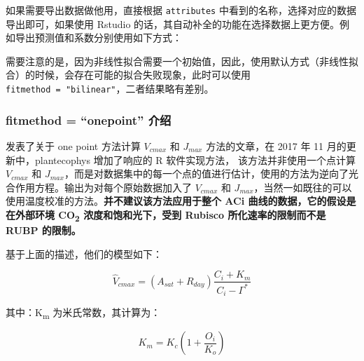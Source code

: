 \documentclass[]{krantz}
\makeatletter
\newenvironment{Shaded}{\begin{snugshade}}{\end{snugshade}}
\newcommand{\KeywordTok}[1]{\textcolor[rgb]{0.13,0.29,0.53}{\textbf{#1}}}
\newcommand{\DataTypeTok}[1]{\textcolor[rgb]{0.13,0.29,0.53}{#1}}
\newcommand{\StringTok}[1]{\textcolor[rgb]{0.31,0.60,0.02}{#1}}
\newcommand{\CommentTok}[1]{\textcolor[rgb]{0.56,0.35,0.01}{\textit{#1}}}
\newcommand{\OperatorTok}[1]{\textcolor[rgb]{0.81,0.36,0.00}{\textbf{#1}}}
\newcommand{\NormalTok}[1]{#1}
\renewenvironment{quote}{\begin{VF}}{\end{VF}}
\newenvironment{kframe}{%
\medskip{}
\setlength{\fboxsep}{.8em}
 \def\at@end@of@kframe{}%
 \ifinner\ifhmode%
  \def\at@end@of@kframe{\end{minipage}}%
  \begin{minipage}{\columnwidth}%
 \fi\fi%
 \def\FrameCommand##1{\hskip\@totalleftmargin \hskip-\fboxsep
 \colorbox{shadecolor}{##1}\hskip-\fboxsep
     \hskip-\linewidth \hskip-\@totalleftmargin \hskip\columnwidth}%
 \MakeFramed {\advance\hsize-\width
   \@totalleftmargin\z@ \linewidth\hsize
   \@setminipage}}%
 {\par\unskip\endMakeFramed%
 \at@end@of@kframe}
\renewenvironment{Shaded}{\begin{kframe}}{\end{kframe}}
\theoremstyle{definition}
\theoremstyle{definition}
\theoremstyle{definition}
\theoremstyle{remark}
\makeatother
\begin{document}
如果需要导出数据做他用，直接根据 \texttt{attributes}
中看到的名称，选择对应的数据导出即可，如果使用 Rstudio
的话，其自动补全的功能在选择数据上更方便。例如导出预测值和系数分别使用如下方式：

\begin{Shaded}
\end{Shaded}

\begin{quote}
需要注意的是，因为非线性拟合需要一个初始值，因此，使用默认方式（非线性拟合）的时候，会存在可能的拟合失败现象，此时可以使用
\texttt{fitmethod\ =\ "bilinear"}，二者结果略有差别。
\end{quote}

\subsubsection{\texorpdfstring{fitmethod = ``onepoint''
介绍}{fitmethod = onepoint 介绍}}\label{fitmethod-onepoint-}

\citet{De2016A} 发表了关于 one point 方法计算 \(V_{cmax}\) 和
\(J_{max}\) 方法的文章，在 2017 年 11 月的更新中，plantecophys
增加了响应的 R 软件实现方法， 该方法并非使用一个点计算 \(V_{cmax}\) 和
\(J_{max}\)，而是对数据集中的每一个点的值进行估计，使用的方法为逆向了光合作用方程。输出为对每个原始数据加入了
\(V_{cmax}\) 和
\(J_{max}\)，当然一如既往的可以使用温度校准的方法。\textbf{并不建议该方法应用于整个
ACi 曲线的数据，它的假设是在外部环境 CO\textsubscript{2}
浓度和饱和光下，受到 Rubisco 所化速率的限制而不是 RUBP 的限制。}

基于上面的描述，他们的模型如下：

\begin{equation}
\hat{V}_{cmax} = (A_{sat} + R_{day}) \frac{C_i + K_m}{C_i - \Gamma^*} 
\label{eq:inverseA}
\end{equation}

其中：K\textsubscript{m} 为米氏常数，其计算为：

\begin{equation}
K_m = K_c (1 + \frac{O_i}{K_o}) 
\label{eq:km}
\end{equation}
\end{document}

